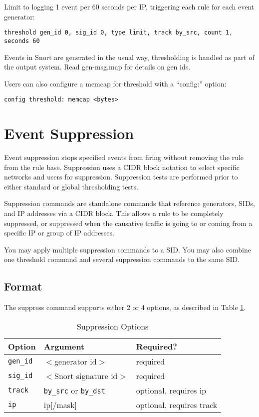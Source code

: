 \documentclass[english]{report}
\begin{document}
Limit to logging 1 event per 60 seconds per IP, triggering each rule for each event generator:
\begin{verbatim}
threshold gen_id 0, sig_id 0, type limit, track by_src, count 1, seconds 60
\end{verbatim}

Events in Snort are generated in the usual way, thresholding is handled as part
of the output system. Read gen-msg.map for details on gen ids.

Users can also configure a memcap for threshold with a ``config:'' option:

\begin{verbatim}
config threshold: memcap <bytes>
\end{verbatim}

\clearpage
\section{Event Suppression}
Event suppression stops specified events from firing without removing the rule
from the rule base. Suppression uses a CIDR block notation to select specific
networks and users for suppression.  Suppression tests are performed prior to
either standard or global thresholding tests.

Suppression commands are standalone commands that reference generators, SIDs,
and IP addresses via a CIDR block. This allows a rule to be completely
suppressed, or suppressed when the causative traffic is going to or coming
from a specific IP or group of IP addresses.

You may apply multiple suppression commands to a SID.  You may also combine one
threshold command and several suppression commands to the same SID.  

\subsection{Format}

The suppress command supports either 2 or 4 options, as described in Table \ref{suppression_options}. 

\begin{table}[!hbpt]
\caption{Suppression Options\label{suppression_options}}
\begin{center}\begin{tabular}{| l | p{3.5in} | l |}
\hline
\textbf{Option} & \textbf{Argument} & \textbf{Required?}\\
\hline
\hline
\texttt{gen\_id} & $<$generator id$>$ & required\\
\hline
\texttt{sig\_id} & $<$Snort signature id$>$  & required\\
\hline
\texttt{track} & \texttt{by\_src} or \texttt{by\_dst}  & optional, requires ip\\
\hline
\texttt{ip} & ip[/mask] & optional, requires track \\
\hline
\end{tabular}\end{center}
\end{table}
\end{document}
